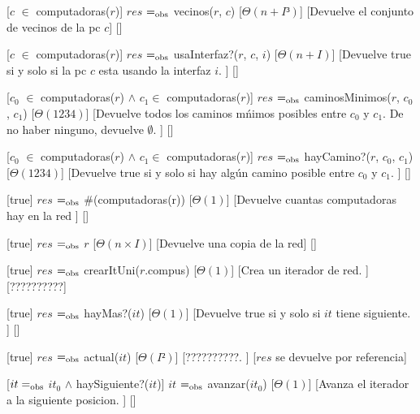 \begin{Interfaz}
  [$c$ $\in$ computadoras($r$)]%
  {$res$ $=_{\mathrm{obs}}$ vecinos($r$, $c$)}%
  [$\Theta(n+I³)$]%
  [Devuelve el conjunto de vecinos de la pc $c$]%
  []%
  
  [$c$ $\in$ computadoras($r$)]%
  {$res$ $=_{\mathrm{obs}}$ usaInterfaz?($r$, $c$, $i$)}%
  [$\Theta(n+I)$]%
  [Devuelve true si y solo si la pc $c$ esta usando la interfaz $i$. ]%
  []%
  
  [$c_{0}$ $\in$ computadoras($r$) $\land$ $c_{1} \in $ computadoras($r$)]%
  {$res$ $=_{\mathrm{obs}}$ caminosMinimos($r$, $c_{0}$, $c_{1}$)}%
  [$\Theta(1234)$]%
  [Devuelve todos los caminos m\'nimos posibles entre $c_{0}$ y $c_{1}$. De no haber ninguno, devuelve $\emptyset$. ]%
  []%
  
  [$c_{0}$ $\in$ computadoras($r$) $\land$ $c_{1} \in $ computadoras($r$)]%
  {$res$ $=_{\mathrm{obs}}$ hayCamino?($r$, $c_{0}$, $c_{1}$)}%
  [$\Theta(1234)$]%
  [Devuelve true si y solo si hay alg\'un camino posible entre $c_{0}$ y $c_{1}$. ]%
  []%
  
  [true]%
  {$res$ $=_{\mathrm{obs}}$ \#(computadoras(r))}%
  [$\Theta(1)$]%
  [Devuelve cuantas computadoras hay en la red ]%
  []%

  [true]%
  {$res$ $=_{\mathrm{obs}}$ $r$}%
  [$\Theta(n \times I)$]%
  [Devuelve una copia de la red]%
  []%


  [true]%
  {$res$ $=_{\mathrm{obs}}$ crearItUni($r$.compus)}%
  [$\Theta(1)$]%
  [Crea un iterador de red.  ]%
  [??????????]%

  [true]%
  {$res$ $=_{\mathrm{obs}}$ hayMas?($it$)}%
  [$\Theta(1)$]%
  [Devuelve true si y solo si $it$ tiene siguiente. ]%
  []%

  [true]%
  {$res$ $=_{\mathrm{obs}}$ actual($it$)}%
  [$\Theta(I²)$]%
  [??????????. ]%
  [$res$ se devuelve por referencia]%

  [$it =_{\mathrm{obs}}$ $it_{0}$ $\land$ haySiguiente?($it$)]%
  {$it$ $=_{\mathrm{obs}}$ avanzar($it_{0}$)}%
  [$\Theta(1)$]%
  [Avanza el iterador a la siguiente posicion. ]%
  []%
  

\end{Interfaz}

